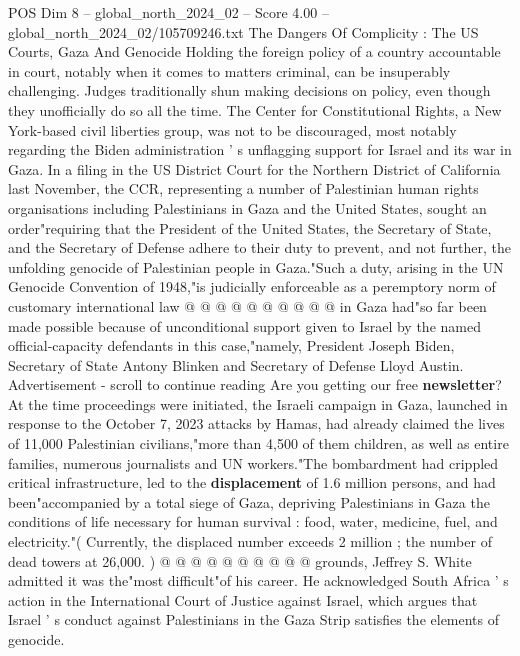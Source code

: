 \begin{textsample}{POS Dim 8 – global\_north\_2024\_02 – Score 4.00 – global\_north\_2024\_02/105709246.txt}  \label{ex:f8_pos_214}
The Dangers Of Complicity : The US Courts, Gaza And Genocide Holding the foreign policy of a country accountable in court, notably when it comes to matters criminal, can be insuperably challenging.
Judges traditionally shun making decisions on policy, even though they unofficially do so all the time.
The Center for Constitutional Rights, a New York-based civil liberties group, was not to be discouraged, most notably regarding the Biden administration ' s unflagging support for Israel and its war in Gaza.
In a filing in the US District Court for the Northern District of California last November, the CCR, representing a number of Palestinian human rights organisations including Palestinians in Gaza and the United States, sought an order"requiring that the President of the United States, the Secretary of State, and the Secretary of Defense adhere to their duty to prevent, and not further, the unfolding genocide of Palestinian people in Gaza."Such a duty, arising in the UN Genocide Convention of 1948,"is judicially enforceable as a peremptory norm of customary international law @ @ @ @ @ @ @ @ @ @ in Gaza had"so far been made possible because of unconditional support given to Israel by the named official-capacity defendants in this case,"namely, President Joseph Biden, Secretary of State Antony Blinken and Secretary of Defense Lloyd Austin.
Advertisement - scroll to continue reading Are you getting our free \textbf{newsletter}?
At the time proceedings were initiated, the Israeli campaign in Gaza, launched in response to the October 7, 2023 attacks by Hamas, had already claimed the lives of 11,000 Palestinian civilians,"more than 4,500 of them children, as well as entire families, numerous journalists and UN workers."The bombardment had crippled critical infrastructure, led to the \textbf{displacement} of 1.6 million persons, and had been"accompanied by a total siege of Gaza, depriving Palestinians in Gaza the conditions of life necessary for human survival : food, water, medicine, fuel, and electricity."( Currently, the displaced number exceeds 2 million ; the number of dead towers at 26,000. ) @ @ @ @ @ @ @ @ @ @ grounds, Jeffrey S.
White admitted it was the"most difficult"of his career.
He acknowledged South Africa ' s action in the International Court of Justice against Israel, which argues that Israel ' s conduct against Palestinians in the Gaza Strip satisfies the elements of genocide.

\end{textsample}
